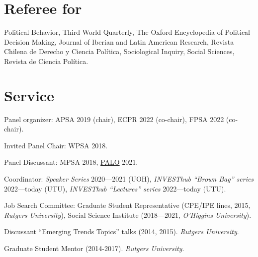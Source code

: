 \documentclass[letterpaper]{article}
\renewenvironment{itemize}{
  \begin{list}{}{
    \setlength{\leftmargin}{1.5em}
  }
}{
  \end{list}
}
\begin{document}

\section*{Referee for}
  \begin{itemize}
    \item[\textcolor{gray}{\textbullet}] Political Behavior, Third World Quarterly, The Oxford Encyclopedia of Political Decision Making, Journal of Iberian and Latin American Research, Revista Chilena de Derecho y Ciencia Pol\'itica, Sociological Inquiry, Social Sciences, Revista de Ciencia Pol\'itica.
  \end{itemize}




\section*{Service}

\begin{itemize}
\item[\textcolor{gray}{\textbullet}] Panel organizer: APSA 2019 (chair), ECPR 2022 (co-chair), FPSA 2022 (co-chair).
\item[\textcolor{gray}{\textbullet}] Invited Panel Chair: WPSA 2018.
\item[\textcolor{gray}{\textbullet}] Panel Discussant: MPSA 2018, \href{https://paloresearch.fi/en/events/finalconference/}{PALO} 2021.
\item[\textcolor{gray}{\textbullet}] Coordinator: \emph{Speaker Series} 2020---2021 (UOH), \emph{INVESThub ``Brown Bag'' series} 2022---today (UTU), \emph{INVESThub ``Lectures'' series} 2022---today (UTU).
\item[\textcolor{gray}{\textbullet}] Job Search Committee: Graduate Student Representative (CPE/IPE lines, 2015, \emph{Rutgers University}), Social Science Institute (2018---2021, \emph{O'Higgins University}).
\item[\textcolor{gray}{\textbullet}] Discussant ``Emerging Trends Topics'' talks (2014, 2015). \emph{Rutgers University}.
\item[\textcolor{gray}{\textbullet}] Graduate Student Mentor (2014-2017). \emph{Rutgers University}.
\end{itemize}
\end{document}
